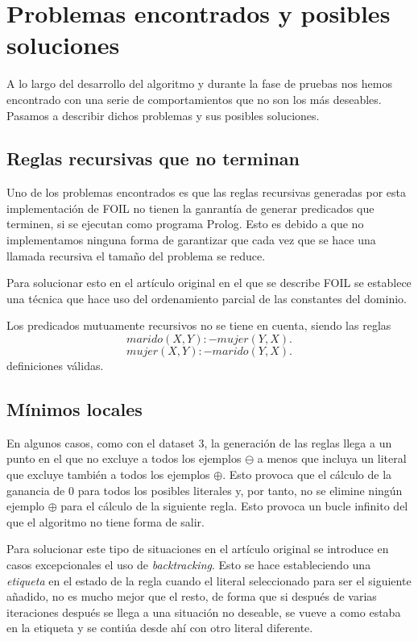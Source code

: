 \section{Problemas encontrados y posibles soluciones}
A lo largo del desarrollo del algoritmo y durante la fase de pruebas nos hemos encontrado con una serie de comportamientos que no son los más deseables. Pasamos a describir dichos problemas y sus posibles soluciones.

\subsection{Reglas recursivas que no terminan}
Uno de los problemas encontrados es que las reglas recursivas generadas por esta implementación de FOIL no tienen la ganrantía de generar predicados que terminen, si se ejecutan como programa Prolog. Esto es debido a que no implementamos ninguna forma de garantizar que cada vez que se hace una llamada recursiva el tamaño del problema se reduce.

Para solucionar esto en el artículo original en el que se describe FOIL se establece una técnica que hace uso del ordenamiento parcial de las constantes del dominio.

Los predicados mutuamente recursivos no se tiene en cuenta, siendo las reglas
\begin{equation}
  marido(X,Y) :- mujer(Y,X).
\end{equation}
\begin{equation}
  mujer(X,Y) :- marido(Y,X).
\end{equation}
definiciones válidas.

\subsection{Mínimos locales}
En algunos casos, como con el dataset 3, la generación de las reglas llega a un punto en el que no excluye a todos los ejemplos $\ominus$ a menos que incluya un literal que excluye también a todos los ejemplos $\oplus$. Esto provoca que el cálculo de la ganancia de 0 para todos los posibles literales y, por tanto, no se elimine ningún ejemplo $\oplus$ para el cálculo de la siguiente regla. Esto provoca un bucle infinito del que el algoritmo no tiene forma de salir.

Para solucionar este tipo de situaciones en el artículo original se introduce en casos excepcionales el uso de \emph{backtracking}. Esto se hace estableciendo una \emph{etiqueta} en el estado de la regla cuando el literal seleccionado para ser el siguiente añadido, no es mucho mejor que el resto, de forma que si después de varias iteraciones después se llega a una situación no deseable, se vueve a como estaba en la etiqueta y se contiúa desde ahí con otro literal diferente.

